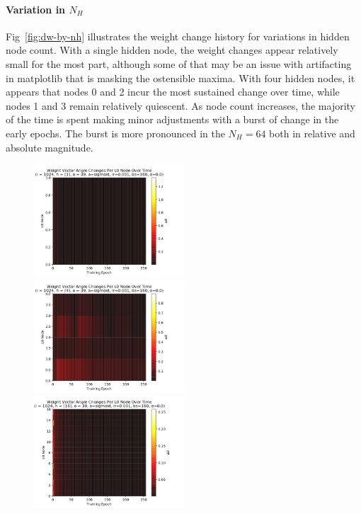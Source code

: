 \documentclass[10pt,epsf]{article}
\begin{document}
{{    \paragraph{Variation in $N_H$}{
      Fig~\ref{fig:dw-by-nh} illustrates the weight change history for variations in hidden node count.
      With a single hidden node, the weight changes appear relatively small for the most part, although
      some of that may be an issue with artifacting in matplotlib that is masking the ostensible maxima.
      With four hidden nodes, it appears that nodes 0 and 2 incur the most sustained change over time,
      while nodes 1 and 3 remain relatively quiescent. As node count increases, the majority of the time
      is spent making minor adjustments with a burst of change in the early epochs. The burst is more
      pronounced in the $N_H = 64$ both in relative and absolute magnitude.
    }
    \begin{figure}[h]
      \includegraphics[width=0.5\textwidth]{./img/1-0.001-160-0-sigmoid-1/weight-angle-changes-L0-255.png}
      \includegraphics[width=0.5\textwidth]{./img/4-0.001-160-0-sigmoid-1/weight-angle-changes-L0-255.png}
      \includegraphics[width=0.5\textwidth]{./img/16-0.001-160-0-sigmoid-1/weight-angle-changes-L0-255.png}

\end{figure}}}
\end{document}
